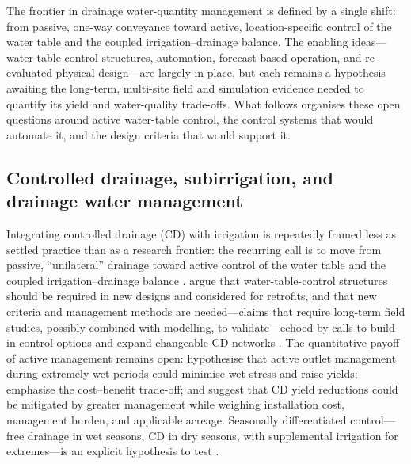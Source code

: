 The frontier in drainage water-quantity management is defined by a single
shift: from passive, one-way conveyance toward active, location-specific
control of the water table and the coupled irrigation--drainage balance. The
enabling ideas---water-table-control structures, automation, forecast-based
operation, and re-evaluated physical design---are largely in place, but each
remains a hypothesis awaiting the long-term, multi-site field and simulation
evidence needed to quantify its yield and water-quality trade-offs. What
follows organises these open questions around active water-table control, the
control systems that would automate it, and the design criteria that would
support it.

\subsection{Controlled drainage, subirrigation, and drainage water management}

Integrating controlled drainage (CD) with irrigation is repeatedly framed less
as settled practice than as a research frontier: the recurring call is to move
from passive, ``unilateral'' drainage toward active control of the water table
and the coupled irrigation--drainage balance
\parencite{Ayars2006b,Kesicka2023b,Ritzema2023}. \textcite{Ayars2006b} argue
that water-table-control structures should be required in new designs and
considered for retrofits, and that new criteria and management methods are
needed---claims that require long-term field studies, possibly combined with
modelling, to validate---echoed by calls to build in control options and expand
changeable CD networks \parencite{Dukhovny2018,Mahmoud2021,Strock2011}. The
quantitative payoff of active management remains open: \textcite{Watkins2024}
hypothesise that active outlet management during extremely wet periods could
minimise wet-stress and raise yields; \textcite{Saadat2017} emphasise the
cost--benefit trade-off; and \textcite{Helmers2012} suggest that CD yield
reductions could be mitigated by greater management while weighing installation
cost, management burden, and applicable acreage. Seasonally differentiated
control---free drainage in wet seasons, CD in dry seasons, with supplemental
irrigation for extremes---is an explicit hypothesis to test
\parencite{Asgari2021}.

